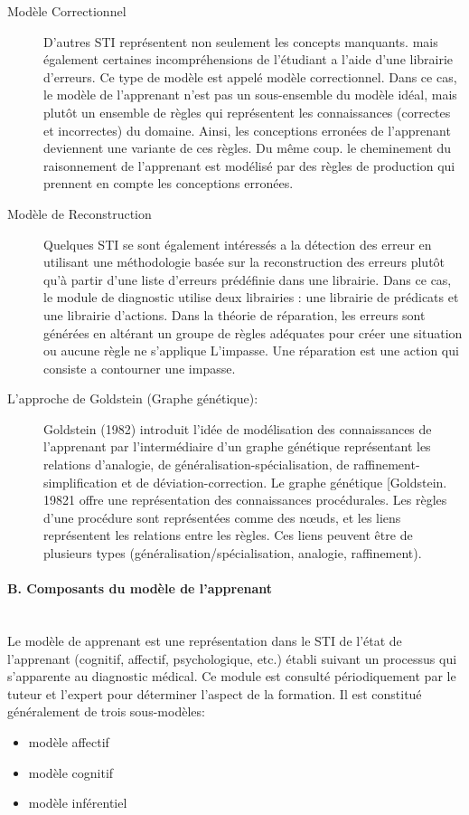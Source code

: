 \begin{description}
    \item[Modèle Correctionnel] D'autres STI représentent non seulement les concepts manquants. mais également certaines incompréhensions de l'étudiant a l'aide d'une librairie d'erreurs. Ce type de modèle est appelé modèle correctionnel. Dans ce cas, le modèle de l'apprenant n'est pas un sous-ensemble du modèle idéal, mais plutôt un ensemble de règles qui représentent les connaissances (correctes et incorrectes) du domaine. Ainsi, les conceptions erronées de l'apprenant deviennent une variante de ces règles. Du même coup. le cheminement du raisonnement de l'apprenant est modélisé par des règles de production qui prennent en compte les conceptions erronées.
    
    \item[Modèle de Reconstruction] Quelques STI se sont également intéressés a la détection des erreur en utilisant une méthodologie basée sur la reconstruction des erreurs plutôt qu'à partir d'une liste d'erreurs prédéfinie dans une librairie. Dans ce cas, le module de diagnostic utilise deux librairies : une librairie de prédicats et une librairie d'actions. Dans la théorie de réparation, les erreurs sont générées en altérant un groupe de règles adéquates pour créer une situation ou aucune règle ne s'applique L'impasse. Une réparation est une action qui consiste a contourner une impasse.
    
    \item[L'approche de Goldstein (Graphe génétique):] Goldstein (1982) introduit l'idée de modélisation des connaissances de l'apprenant par l'intermédiaire d'un graphe génétique représentant les relations d'analogie, de généralisation-spécialisation, de raffinement-simplification et de déviation-correction.
    Le graphe génétique [Goldstein. 19821 offre une représentation des connaissances procédurales. Les règles d'une procédure sont représentées comme des nœuds, et les liens représentent les relations entre les règles. Ces liens peuvent être de plusieurs types (généralisation/spécialisation, analogie, raffinement).
\end{description}

\paragraph{B. Composants du modèle de l'apprenant}\mbox{}\\
Le modèle de apprenant est une représentation dans le STI de l'état de l'apprenant (cognitif, affectif, psychologique, etc.) établi suivant un processus qui
s'apparente au diagnostic médical. Ce module est consulté périodiquement par le
tuteur et l'expert pour déterminer l'aspect de la formation.
 Il est constitué généralement de trois sous-modèles:
 \begin{itemize}
     \item modèle affectif
    \item modèle cognitif
    \item modèle inférentiel 
\end{itemize}


